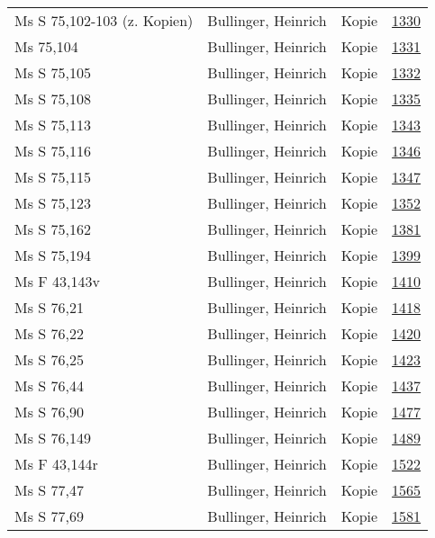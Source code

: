 \documentclass[10pt,a4paper,landscape]{report}
\begin{document}
\begin{longtable}{p{16cm}p{4cm}lr}
Ms S 75,102-103 (z. Kopien)	&	Bullinger, Heinrich	&	Kopie	&	\href{http://130.60.24.72/assignment/1330}{1330}\\
Ms 75,104	&	Bullinger, Heinrich	&	Kopie	&	\href{http://130.60.24.72/assignment/1331}{1331}\\
Ms S 75,105	&	Bullinger, Heinrich	&	Kopie	&	\href{http://130.60.24.72/assignment/1332}{1332}\\
Ms S 75,108	&	Bullinger, Heinrich	&	Kopie	&	\href{http://130.60.24.72/assignment/1335}{1335}\\
Ms S 75,113	&	Bullinger, Heinrich	&	Kopie	&	\href{http://130.60.24.72/assignment/1343}{1343}\\
Ms S 75,116	&	Bullinger, Heinrich	&	Kopie	&	\href{http://130.60.24.72/assignment/1346}{1346}\\
Ms S 75,115	&	Bullinger, Heinrich	&	Kopie	&	\href{http://130.60.24.72/assignment/1347}{1347}\\
Ms S 75,123	&	Bullinger, Heinrich	&	Kopie	&	\href{http://130.60.24.72/assignment/1352}{1352}\\
Ms S 75,162	&	Bullinger, Heinrich	&	Kopie	&	\href{http://130.60.24.72/assignment/1381}{1381}\\
Ms S 75,194	&	Bullinger, Heinrich	&	Kopie	&	\href{http://130.60.24.72/assignment/1399}{1399}\\
Ms F 43,143v	&	Bullinger, Heinrich	&	Kopie	&	\href{http://130.60.24.72/assignment/1410}{1410}\\
Ms S 76,21	&	Bullinger, Heinrich	&	Kopie	&	\href{http://130.60.24.72/assignment/1418}{1418}\\
Ms S 76,22	&	Bullinger, Heinrich	&	Kopie	&	\href{http://130.60.24.72/assignment/1420}{1420}\\
Ms S 76,25	&	Bullinger, Heinrich	&	Kopie	&	\href{http://130.60.24.72/assignment/1423}{1423}\\
Ms S 76,44	&	Bullinger, Heinrich	&	Kopie	&	\href{http://130.60.24.72/assignment/1437}{1437}\\
Ms S 76,90	&	Bullinger, Heinrich	&	Kopie	&	\href{http://130.60.24.72/assignment/1477}{1477}\\
Ms S 76,149	&	Bullinger, Heinrich	&	Kopie	&	\href{http://130.60.24.72/assignment/1489}{1489}\\
Ms F 43,144r	&	Bullinger, Heinrich	&	Kopie	&	\href{http://130.60.24.72/assignment/1522}{1522}\\
Ms S 77,47	&	Bullinger, Heinrich	&	Kopie	&	\href{http://130.60.24.72/assignment/1565}{1565}\\
Ms S 77,69	&	Bullinger, Heinrich	&	Kopie	&	\href{http://130.60.24.72/assignment/1581}{1581}\\

\end{longtable}
\end{document}
